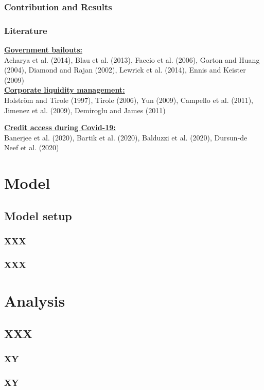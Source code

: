 \documentclass[13.8pt]{beamer}
\begin{document}
\begin{frame}
\frametitle{Contribution and Results}
\end{frame}

\begin{frame}
\frametitle{Literature}
\textbf{\large\underline{Government bailouts:}}\\ 
Acharya et al. (2014), Blau et al. (2013), Faccio et al. (2006), Gorton and Huang (2004), Diamond and Rajan (2002), Lewrick et al. (2014), Ennis and Keister (2009) \\
\vspace{0.5cm}
\textbf{\large\underline{Corporate liquidity management:}}\\
Holström and Tirole (1997), Tirole (2006), Yun (2009), Campello et al. (2011), Jimenez et al. (2009), Demiroglu and James (2011)


\vspace{1cm}
\textbf{\large\underline{Credit access during Covid-19:}}\\
Banerjee et al. (2020), Bartik et al. (2020), Balduzzi et al. (2020), Dursun-de Neef et al. (2020)


\end{frame}

\section{Model}
\subsection{Model setup}
\begin{frame}
\frametitle{XXX}
\end{frame}

\begin{frame}
\frametitle{XXX}
\end{frame}

\section{Analysis}
\subsection{XXX}
\begin{frame}
\frametitle{XY}
\end{frame}

\begin{frame}
\frametitle{XY}
\end{frame}
\end{document}
